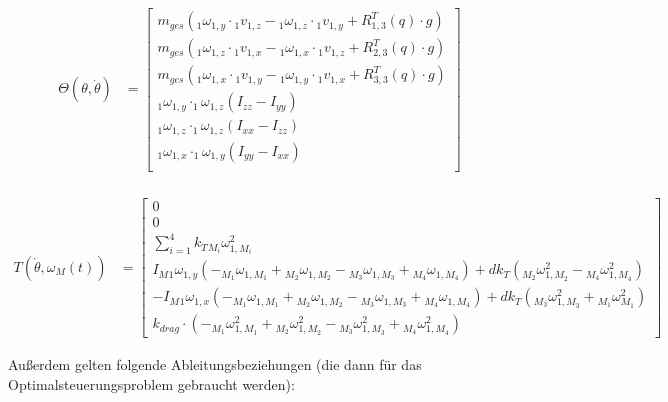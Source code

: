 \documentclass[12pt, a4paper]{scrartcl}
\begin{document}
\begin{align*}	
	\Theta(\theta, \dot \theta ) &=
			\left[
				\begin{matrix}
					m_{ges} \left( {_{1}} \omega_{1, y} \cdot {_{1}} v_{1, z} -  {_{1}} \omega_{1, z} \cdot {_{1}} v_{1, y} + R_{1, 3}^T(q) \cdot g \right)\\
					m_{ges} \left( {_{1}} \omega_{1, z} \cdot {_{1}} v_{1, x} -  {_{1}} \omega_{1, x} \cdot {_{1}} v_{1, z} + R_{2, 3}^T(q) \cdot g \right)\\
					m_{ges} \left( {_{1}} \omega_{1, x} \cdot {_{1}} v_{1, y} -  {_{1}} \omega_{1, y} \cdot {_{1}} v_{1, x} + R_{3, 3}^T(q) \cdot g \right)\\
					_{1}\omega_{1,y} \cdot _{1}\omega_{1,z}\left(I_{zz}-I_{yy}\right)  \\
					_{1}\omega_{1,z} \cdot _{1}\omega_{1,z}\left(I_{xx}-I_{zz}\right)  \\
					_{1}\omega_{1,x} \cdot _{1}\omega_{1,y}\left(I_{yy}-I_{xx}\right)  \\
				\end{matrix}
			\right] \\
\end{align*}

\begin{align*}		
	T(\dot\theta, \omega_M(t))  &= 
	\left[
	\begin{matrix}   0 \\ 
	                 0 \\ 
                   \sum_{i = 1}^4 k_{T} {_{M_i}\omega^2_{1,M_i}} \\
                   I_M {_{1}\omega_{1, y}} (- {_{M_1}\omega_{1,M_1}}+ {_{M_2}\omega_{1,M_2}} - {_{M_3}\omega_{1,M_3}} + {_{M_4}\omega_{1,M_4}}) + d k_{T} \left({_{M_2}\omega^2_{1,M_2}} - {_{M_4}\omega^2_{1,M_4}}\right) \\
                   -I_M {_{1}\omega_{1, x}} ( -{_{M_1}\omega_{1,M_1}} + {_{M_2}\omega_{1,M_2}} - {_{M_3}\omega_{1,M_3}} + {_{M_4}\omega_{1,M_4}}) +d k_{T} \left({_{M_3}\omega^2_{1,M_3}} + {_{M_1}{\omega}^{2}_{M_1}}\right) \\
                  k_{drag} \cdot \left(- {_{M_1}\omega^2_{1,M_1}} + {_{M_2}\omega^2_{1,M_2}}  - {_{M_3}\omega^2_{1,M_3}} +  {_{M_4}\omega^2_{1,M_4}}\right)  \end{matrix}
	\right]
\end{align*}

Außerdem gelten folgende Ableitungsbeziehungen (die dann für das Optimalsteuerungsproblem gebraucht werden):
\end{document}
